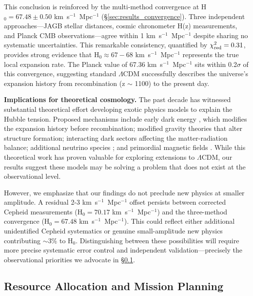 \documentclass[twocolumn, linenumbers]{aastex701}
\begin{document}
This conclusion is reinforced by the multi-method convergence at H$_0 = 67.48 \pm 0.50$ km~s$^{-1}$~Mpc$^{-1}$ (\S\ref{sec:results_convergence}). Three independent approaches---JAGB stellar distances, cosmic chronometer H(z) measurements, and Planck CMB observations---agree within 1 km~s$^{-1}$~Mpc$^{-1}$ despite sharing no systematic uncertainties. This remarkable consistency, quantified by $\chi^2_{\rm red} = 0.31$, provides strong evidence that H$_0 \approx 67-68$ km~s$^{-1}$~Mpc$^{-1}$ represents the true local expansion rate. The Planck value of 67.36 km~s$^{-1}$~Mpc$^{-1}$ sits within 0.2$\sigma$ of this convergence, suggesting standard $\Lambda$CDM successfully describes the universe's expansion history from recombination (z $\sim$ 1100) to the present day.

\textbf{Implications for theoretical cosmology.} The past decade has witnessed substantial theoretical effort developing exotic physics models to explain the Hubble tension. Proposed mechanisms include early dark energy \citep{Poulin2019}, which modifies the expansion history before recombination; modified gravity theories \citep{Marra2021} that alter structure formation; interacting dark sectors \citep{DiValentino2020} affecting the matter-radiation balance; additional neutrino species \citep{Anchordoqui2022}; and primordial magnetic fields \citep{Jedamzik2020}. While this theoretical work has proven valuable for exploring extensions to $\Lambda$CDM, our results suggest these models may be solving a problem that does not exist at the observational level.

However, we emphasize that our findings do not preclude new physics at smaller amplitude. A residual 2-3 km~s$^{-1}$~Mpc$^{-1}$ offset persists between corrected Cepheid measurements (H$_0 = 70.17$ km~s$^{-1}$~Mpc$^{-1}$) and the three-method convergence (H$_0 = 67.48$ km~s$^{-1}$~Mpc$^{-1}$). This could reflect either additional unidentified Cepheid systematics or genuine small-amplitude new physics contributing $\sim$3\% to H$_0$. Distinguishing between these possibilities will require more precise systematic error control and independent validation---precisely the observational priorities we advocate in \S\ref{sec:discussion_resources}.

\subsection{Resource Allocation and Mission Planning} \label{sec:discussion_resources}
\end{document}
